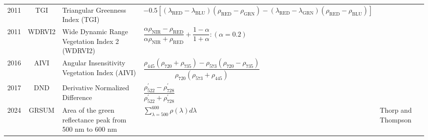 \documentclass[10pt]{article}
\begin{document}
\begin{ThreePartTable}
\begin{longtable}{c c m{2.80in} M{2.80in} M{1.5in}}
  2011 & TGI     & Triangular Greenness Index (TGI)                                               & $-0.5[(\lambda_\text{RED}-\lambda_\text{BLU})(\rho_\text{RED}-\rho_\text{GRN})-(\lambda_\text{RED}-\lambda_\text{GRN})(\rho_\text{RED}-\rho_\text{BLU})]$                                                                                                                               & \citet{Hunt2011}                                    \\
  2011 & WDRVI2  & Wide Dynamic Range Vegetation Index 2 (WDRVI2)                                 & $\dfrac{\alpha\rho_\text{NIR}-\rho_\text{RED}}{\alpha\rho_\text{NIR}+\rho_\text{RED}}+\dfrac{1-\alpha}{1+\alpha} : (\alpha=0.2)$                                                                                                                                                        & \citet{Peng2011}                                    \\
  2016 & AIVI    & Angular Insensitivity Vegetation Index (AIVI)                                  & $\dfrac{\rho_{445}(\rho_{720}+\rho_{735})-\rho_{573}(\rho_{720}-\rho_{735})}{\rho_{720}(\rho_{573}+\rho_{445})}$                                                                                                                                                                        & \citet{He2016}                                      \\
  2017 & DND     & Derivative Normalized Difference                                               & $\dfrac{\rho^\prime_{522}-\rho^\prime_{728}}{\rho^\prime_{522}+\rho^\prime_{728}}$                                                                                                                                                                                                      & \citet{Sonobe2017}                                  \\
  2024 & GRSUM   & Area of the green reflectance peak from 500 nm to 600 nm                       & $\sum\limits_{\lambda=500}^{600}\rho(\lambda)d\lambda$                                                                                                                                                                                                                                  & Thorp and Thompson                                  \\
\end{longtable}
\end{ThreePartTable}
\endgroup

\afterpage{\clearpage


}
\end{document}
